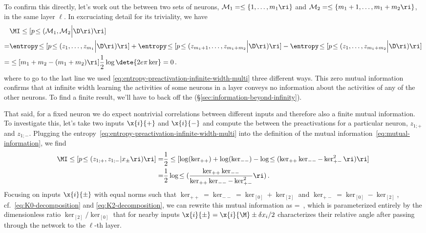 To confirm this directly, let's work out the  between two sets of neurons, $\mathcal{M}_1=\le\{1,\ldots,m_1\ri\}$ and $\mathcal{M}_2=\le\{m_1+1,\ldots,m_1+m_2\ri\}$, in the same layer $\ell$. In excruciating detail for its triviality, 
we have
\begin{align}\label{eq:MIT-zeroth-order}
&\MI\le[p\!\le(\mathcal{M}_1, \mathcal{M}_2\Big\vert \D\ri)\ri]\, \\
=&\entropy\!\le[p\!\le(z_{1},\ldots,z_{m_1}\Big\vert \D\ri)\ri]+\entropy\!\le[p\!\le(z_{m_1+1},\ldots,z_{m_1+m_2}\Big\vert \D\ri)\ri]-\entropy\!\le[p\!\le(z_{1},\ldots,z_{m_1+m_2}\Big\vert \D\ri)\ri]\, \notag\\
=&\le[m_1+m_2-(m_1+m_2)\ri]\frac{1}{2}\log\dete{2e\pi \ker}=0\, .\notag
\end{align}
where to go to the last line we used \eqref{eq:entropy-preactivation-infinite-width-multi} three different ways.
This zero mutual information confirms that at infinite width 
learning the activities of some neurons in a layer conveys no information about the activities of any of the other neurons.
To find a finite result, we'll have to back off the  (\S\ref{sec:information-beyond-infinity}).



That said, for a fixed neuron we do expect nontrivial correlations between different inputs and therefore also a finite mutual information.
To investigate this, let's take two inputs $\x{i}{+}$ and $\x{i}{-}$ and compute the  between the preactivations  for a particular neuron, $z_{1;+}$ and $z_{1;-}$.
Plugging the entropy~\eqref{eq:entropy-preactivation-infinite-width-multi} into the definition of the mutual information~\eqref{eq:mutual-information}, we find
\begin{align}\label{eq:MI-one-neuron-many-samples}
\MI\le[p\!\le(z_{1;+},z_{1;-}| x_{\pm}\ri)\ri]=&\frac{1}{2}\le[\log(\ker_{++})+\log(\ker_{--})-\log\!\le(\ker_{++}\ker_{--}-\ker_{+-}^2\ri)\ri]\, \\
=&\frac{1}{2}\log\!\le(\frac{\ker_{++}\ker_{--}}{\ker_{++}\ker_{--}-\ker_{+-}^2}\ri)\, .\notag
\end{align}
Focusing on inputs $\x{i}{\pm}$ with equal norms such that $\ker_{++}=\ker_{--}=\ker_{[0]}+\ker_{[2]}$ and $\ker_{+-}=\ker_{[0]}-\ker_{[2]}$, cf.~\eqref{eq:K0-decomposition} and \eqref{eq:K2-decomposition}, we can rewrite this mutual information as
\be
\MI\le[p\!\le(z_{1;+},z_{1;-}\ri)\ri]=\log\!\, ,
\ee
which is parameterized  entirely by the dimensionless ratio $\ker_{[2]}/\ker_{[0]}$ that for nearby inputs $\x{i}{\pm} = \x{i}{\M} \pm \delta x_i /2$ characterizes their relative angle after passing through the network to the $\ell$-th layer.

